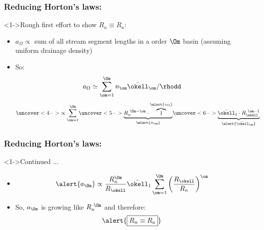 \begin{frame}[label=]
  \frametitle{Reducing Horton's laws:}
  
  \begin{block}<1->{Rough first effort to show $R_n \equiv R_a$:}
    \begin{itemize}
    \item<2-> 
      $a_\Omega \propto$ sum of all stream segment lengths in a order $\Om$ basin
      (assuming uniform drainage density)
    \item<3->
      So:
      $$ a_\Omega \simeq \sum_{\om=1}^{\Om} n_\om \bar{\okell}_\om/\rhodd $$
      $$
      \uncover<4->{
        \propto \sum_{\om=1}^{\Om}
       } 
       \uncover<5->{
         \underbrace{R_n^{\ \Om-\om} \cdot \overbrace{1}^{\alert{n_\Omega}}}_{\alert{n_\om}}
       }
       \uncover<6->{
         \underbrace{\bar{\okell}_1 \cdot R_\okell^{\ \om-1}}_{\alert{\bar{\okell}_\om}}
       }
       $$
    \end{itemize}
  \end{block}
\end{frame}

\begin{frame}[label=]
  \frametitle{Reducing Horton's laws:}

  \begin{block}<1->{Continued ...}
    \begin{itemize}
    \item<1->
      $$
      \alert{a_\Om} \propto \frac{R_n^\Om}{R_\okell} \bar{\okell}_1
      \sum_{\om=1}^{\Om} 
       \left(
         \frac{R_\okell}{R_n}
       \right)^\om
      $$
    \item<4->{
        So, $a_\Om$ is growing like $R_n^{\ \Om}$ and therefore:
        $$
        \alert{\boxed{R_n \equiv R_a}}
        $$
      }
    \end{itemize}
  \end{block}

\end{frame}

